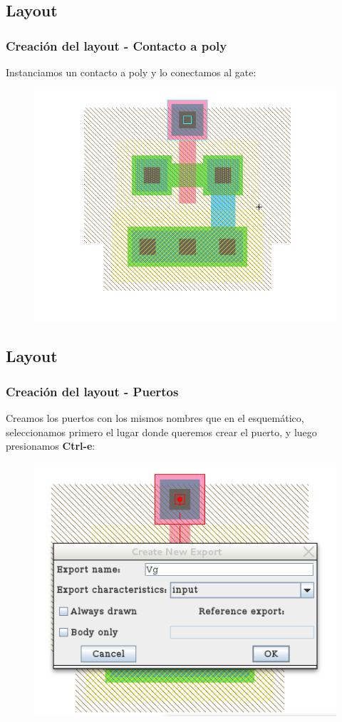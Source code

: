 \documentclass{beamer}
\begin{document}
\begin{frame}
\subsection{Layout}
\frametitle{Creación del layout - Contacto a poly}
Instanciamos un contacto a poly y lo conectamos al gate: 
\begin{figure}
  \includegraphics[width=0.89\linewidth]{figuras/edicionElectric-10.png}
\end{figure}
\end{frame}
\begin{frame}
\subsection{Layout}
\frametitle{Creación del layout - Puertos}
Creamos los puertos con los mismos nombres que en el esquemático, seleccionamos primero el lugar donde queremos crear el puerto, y luego presionamos \textbf{Ctrl-e}:
\begin{figure}
  \includegraphics[width=0.59\linewidth]{figuras/edicionElectric-11.png}
\end{figure}
\end{frame}
\end{document}
